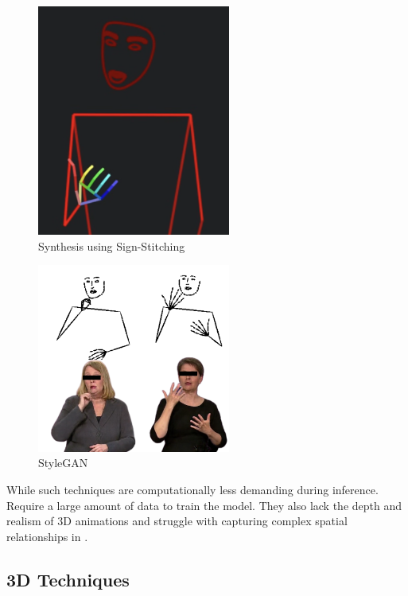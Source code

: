 \documentclass[../../main.tex]{subfiles}
\begin{document}
\begin{figure}
  \centering \includegraphics[width = 2.5in]{chapters/background_work/images/sign_writing_synthesis.png} 
  \caption{Synthesis using Sign-Stitching} 
  \label{fig:synthesis_mediaipe_2d} 
\end{figure}

\begin{figure} 
  \centering \includegraphics[width = 2.5in]{chapters/background_work/images/gan_synthesis.png} 
  \caption{StyleGAN~\cite{saunders2020everybodysignnowtranslating}} 
  \label{fig:synthesis_gan_2d} 
\end{figure}

While such techniques are computationally less demanding during inference. Require a large amount of data to train the model. They also lack the depth and realism of 3D animations and struggle with capturing complex spatial relationships in .

\subsection{3D Techniques}
\label{ch:background_work:sign_language_synthesis:3d_techniques}
\end{document}
